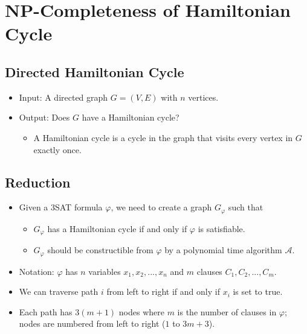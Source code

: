 
\section{NP-Completeness of Hamiltonian Cycle}

\subsection{Directed Hamiltonian Cycle}
\begin{itemize}
    \item Input: A directed graph $G = (V, E)$ with $n$ vertices.
    \item Output: Does $G$ have a Hamiltonian cycle?
    \begin{itemize}
        \item A Hamiltonian cycle is a cycle in the graph that visits every vertex in $G$ exactly once.
    \end{itemize}
\end{itemize}

\subsection{Reduction}
\begin{itemize}
    \item Given a 3SAT formula $\varphi$, we need to create a graph $G_\varphi$ such that
    \begin{itemize}
        \item $G_\varphi$ has a Hamiltonian cycle if and only if $\varphi$ is satisfiable.
        \item $G_\varphi$ should be constructible from $\varphi$ by a polynomial time algorithm $\mathcal{A}$.
    \end{itemize}
    \item Notation: $\varphi$ has $n$ variables $x_1, x_2, ..., x_n$ and $m$ clauses $C_1, C_2, ..., C_m$.
    \item We can traverse path $i$ from left to right if and only if $x_i$ is set to true.
    \item Each path has $3(m + 1)$ nodes where $m$ is the number of clauses in $\varphi$; nodes are numbered from left to right ($1$ to $3m + 3$).
\end{itemize}
